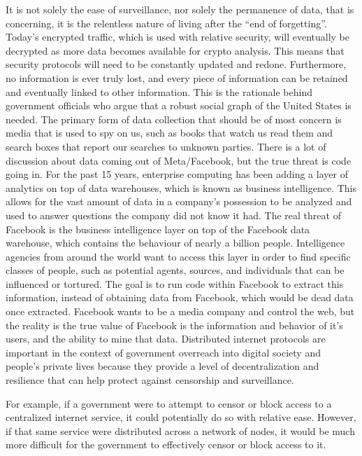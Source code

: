 It is not solely the ease of surveillance, nor solely the permanence of data, that is concerning, it is the relentless nature of living after the ``end of forgetting''. Today's encrypted traffic, which is used with relative security, will eventually be decrypted as more data becomes available for crypto analysis. This means that security protocols will need to be constantly updated and redone. Furthermore, no information is ever truly lost, and every piece of information can be retained and eventually linked to other information. This is the rationale behind government officials who argue that a robust social graph of the United States is needed. The primary form of data collection that should be of most concern is media that is used to spy on us, such as books that watch us read them and search boxes that report our searches to unknown parties. There is a lot of discussion about data coming out of Meta/Facebook, but the true threat is code going in. For the past 15 years, enterprise computing has been adding a layer of analytics on top of data warehouses, which is known as business intelligence. This allows for the vast amount of data in a company's possession to be analyzed and used to answer questions the company did not know it had. The real threat of Facebook is the business intelligence layer on top of the Facebook data warehouse, which contains the behaviour of nearly a billion people. Intelligence agencies from around the world want to access this layer in order to find specific classes of people, such as potential agents, sources, and individuals that can be influenced or tortured. The goal is to run code within Facebook to extract this information, instead of obtaining data from Facebook, which would be dead data once extracted. Facebook wants to be a media company and control the web, but the reality is the true value of Facebook is the information and behavior of it's users, and the ability to mine that data.
Distributed internet protocols are important in the context of government overreach into digital society and people's private lives because they provide a level of decentralization and resilience that can help protect against censorship and surveillance.\par
For example, if a government were to attempt to censor or block access to a centralized internet service, it could potentially do so with relative ease. However, if that same service were distributed across a network of nodes, it would be much more difficult for the government to effectively censor or block access to it.\par
